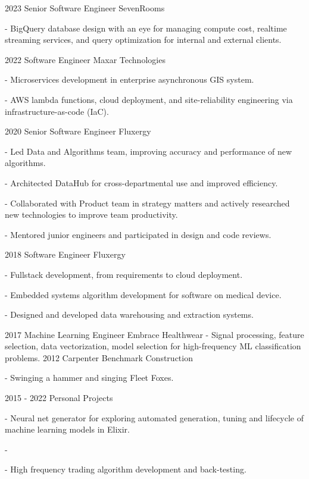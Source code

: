 \documentclass[]{twentysecondcv}
\begin{document}
\begin{twenty}
  \twentyitem
    {2023}
    {Senior Software Engineer}
    {SevenRooms}
    {- BigQuery database design with an eye for managing compute cost, realtime streaming services, and query optimization for internal and external clients.

}
  \twentyitem
    {2022}
    {Software Engineer}
    {Maxar Technologies}
    {- Microservices development in enterprise asynchronous GIS system. 

	- AWS lambda functions, cloud deployment, and site-reliability engineering via infrastructure-as-code (IaC).

}

  \twentyitem
    {2020}
    {Senior Software Engineer}
    {Fluxergy}
    {- Led Data and Algorithms team, improving accuracy and performance of new algorithms.

	- Architected DataHub for cross-departmental use and improved efficiency.

	- Collaborated with Product team in strategy matters and actively researched new technologies to improve team productivity.
	
	- Mentored junior engineers and participated in design and code reviews.

	} 
  \twentyitem
    {2018}
    {Software Engineer}
    {Fluxergy}
    {- Fullstack development, from requirements to cloud deployment.

	- Embedded systems algorithm development for software on medical device.

	- Designed and developed data warehousing and extraction systems.

	} 
  \twentyitem
    {2017}
    {Machine Learning Engineer}
    {Embrace Healthwear}
    {- Signal processing, feature selection, data vectorization, model selection for high-frequency ML classification problems.
	} 
  \twentyitem
    {2012}
    {Carpenter}
    {Benchmark Construction}
    {- Swinging a hammer and singing Fleet Foxes.

	} 
  \twentyitem
    {2015 - 2022}
    {Personal Projects}
    {}
    {- Neural net generator for exploring automated generation, tuning and lifecycle of machine learning models in Elixir.

	- 

	- High frequency trading algorithm development and back-testing.} 
\end{twenty}
\end{document}
